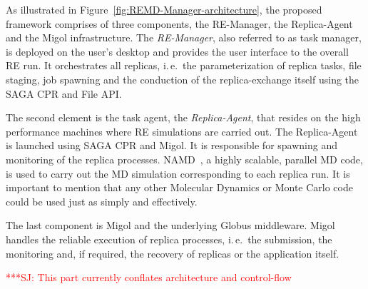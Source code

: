 \documentclass{rspublic}
\newcommand{\alnote}[1]{ {\textcolor{blue} { ***AL: #1 }}}
\newcommand{\jhanote}[1]{ {\textcolor{red} { ***SJ: #1 }}}
\newcommand{\alnote}[1]{}
\newcommand{\jhanote}[1]{}
\newcommand{\replicaagent}[1]{Replica-Agent }
\newcommand{\remanager}[1]{RE-Manager }
\begin{document}
As illustrated in Figure~\ref{fig:REMD-Manager-architecture}, the
proposed framework comprises of three components, the RE-Manager,
the Replica-Agent and the Migol infrastructure. 
The  \emph{RE-Manager}, also referred to as task manager,
is deployed on the user's desktop and provides the user interface 
to the overall RE run. It orchestrates all replicas, i.\,e.\ the 
parameterization of replica  tasks, file staging, job spawning 
and the conduction of the replica-exchange itself using the SAGA CPR
and File API.                                                                

The second element is the task agent, the \textit{Replica-Agent},
that resides on the high performance machines where RE simulations
are carried out. The \replicaagent\ is launched using SAGA CPR and Migol.
It is responsible for spawning and monitoring of the replica processes. 
NAMD~\citep{Phillips:2005gd}, a highly scalable, parallel MD
code, is used to carry out the MD simulation corresponding to each
replica run. It is important to mention that any other Molecular Dynamics 
or Monte Carlo code could be used just as simply and effectively.

The last component is Migol and the underlying Globus middleware. 
Migol handles the reliable execution of replica processes, i.\,e.\ the submission,
the monitoring and, if required, the recovery of replicas or the application itself.


                                  

\jhanote{This part currently conflates architecture and control-flow}
                       
\end{document}
